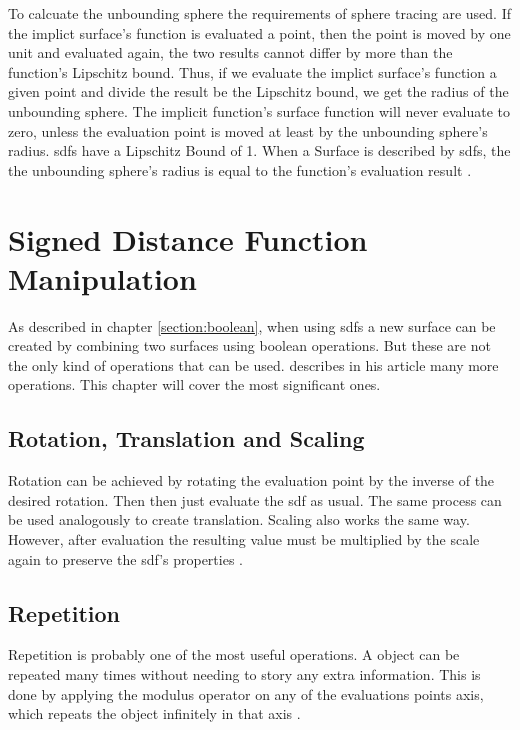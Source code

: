 To calcuate the unbounding sphere the requirements of sphere tracing are used. If the implict surface's function is evaluated a point, then the point is moved by one unit and evaluated again, the two results cannot differ by more than the function's Lipschitz bound. Thus, if we evaluate the implict surface's function a given point and divide the result be the Lipschitz bound, we get the radius of the unbounding sphere. The implicit function's surface function will never evaluate to zero, unless the evaluation point is moved at least by the unbounding sphere's radius. \Glspl{sdf} have a Lipschitz Bound of 1. When a Surface is described by  \glspl{sdf}, the the unbounding sphere's radius is equal to the function's evaluation result \cite{hart:1996:sphere}.

\section{Signed Distance Function Manipulation}
As described in chapter \ref{section:boolean}, when using \glspl{sdf} a new surface can be created by combining two surfaces using boolean operations. But these are not the only kind of operations that can be used. \textcite{quilez:2008:distfunctions} describes in his article many more operations. This chapter will cover the most significant ones.

\subsection{Rotation, Translation and Scaling}
Rotation can be achieved by rotating the evaluation point by the inverse of the desired rotation. Then then just evaluate the \gls{sdf} as usual. The same process can be used analogously to create translation. Scaling also works the same way. However, after evaluation the resulting value must be multiplied by the scale again to preserve the \gls{sdf}'s properties \cite{quilez:2008:distfunctions}.

\subsection{Repetition}
Repetition is probably one of the most useful operations. A object can be repeated many times without needing to story any extra information. This is done by applying the modulus operator on any of the evaluations points axis, which repeats the object infinitely in that axis \cite{quilez:2008:distfunctions}.

